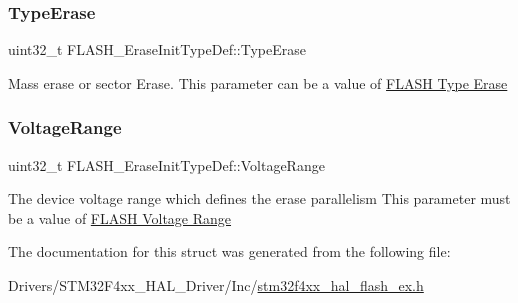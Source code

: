 \subsubsection{\texorpdfstring{Type\+Erase}{TypeErase}}
{\footnotesize\ttfamily uint32\+\_\+t F\+L\+A\+S\+H\+\_\+\+Erase\+Init\+Type\+Def\+::\+Type\+Erase}

Mass erase or sector Erase. This parameter can be a value of \hyperlink{group___f_l_a_s_h_ex___type___erase}{F\+L\+A\+SH Type Erase} \mbox{\label{struct_f_l_a_s_h___erase_init_type_def_a3a2a0c2c4ed573bb84c768c6dbb92cc9}} 
\subsubsection{\texorpdfstring{Voltage\+Range}{VoltageRange}}
{\footnotesize\ttfamily uint32\+\_\+t F\+L\+A\+S\+H\+\_\+\+Erase\+Init\+Type\+Def\+::\+Voltage\+Range}

The device voltage range which defines the erase parallelism This parameter must be a value of \hyperlink{group___f_l_a_s_h_ex___voltage___range}{F\+L\+A\+SH Voltage Range} 

The documentation for this struct was generated from the following file\+:\begin{DoxyCompactItemize}
\item 
Drivers/\+S\+T\+M32\+F4xx\+\_\+\+H\+A\+L\+\_\+\+Driver/\+Inc/\hyperlink{stm32f4xx__hal__flash__ex_8h}{stm32f4xx\+\_\+hal\+\_\+flash\+\_\+ex.\+h}\end{DoxyCompactItemize}

